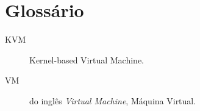 %
%
\chapter{Glossário}

\begin{description}
\item[KVM] Kernel-based Virtual Machine.
\item[VM] do inglês \emph{Virtual Machine}, Máquina Virtual.
\end{description}

